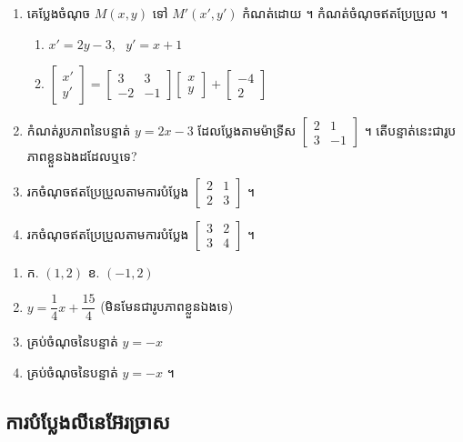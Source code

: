 \begin{pro}
\begin{enumerate}[1]
  \item គេប្លែងចំណុច $M(x, y)$ ទៅ $M'(x', y')$ កំណត់ដោយ ។ កំណត់ចំណុចឥតប្រែប្រួល ។
  \begin{enumerate}[a]
    \item $x' = 2y - 3$, \ $y' = x + 1$
    \item $\begin{bmatrix} x'\\ y' \end{bmatrix} = \begin{bmatrix} 3 & 3\\ -2 & -1 \end{bmatrix}\begin{bmatrix} x\\ y \end{bmatrix} + \begin{bmatrix} -4\\ 2 \end{bmatrix}$
  \end{enumerate}
  \item កំណត់រូបភាពនៃបន្ទាត់ $y = 2x - 3$ ដែលប្លែងតាមម៉ាទ្រីស $\begin{bmatrix} 2 & 1\\ 3 & -1 \end{bmatrix}$ ។ តើបន្ទាត់នេះជារូបភាពខ្លួនឯងដដែលឬទេ?
  \item រកចំណុចឥតប្រែប្រួលតាមការបំប្លែង $\begin{bmatrix} 2 & 1\\ 2 & 3 \end{bmatrix}$ ។
  \item រកចំណុចឥតប្រែប្រួលតាមការបំប្លែង $\begin{bmatrix} 3 & 2\\ 3 & 4 \end{bmatrix}$ ។
\end{enumerate}
\ans
\begin{enumerate}[1]
  \item ក. $(1, 2)$ \quad ខ. $(-1, 2)$
  \item $y = \dfrac{1}{4}x + \dfrac{15}{4}$ (មិនមែនជារូបភាពខ្លួនឯងទេ)
  \item គ្រប់ចំណុចនៃបន្ទាត់ $y = -x$
  \item គ្រប់ចំណុចនៃបន្ទាត់ $y = -x$ ។
\end{enumerate}
\end{pro}

\subsection{ការបំប្លែងលីនេអ៊ែរច្រាស}

